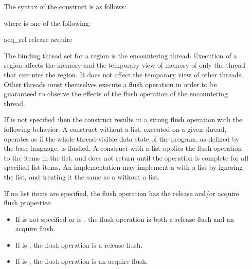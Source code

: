 \begin{fortranspecific}
The syntax of the  construct is as follows:

\begin{samepage}
where  is one of the following:

\begin{indentedcodelist}
acq_rel
release
acquire
\end{indentedcodelist}
\end{samepage}
\end{fortranspecific}

\binding
The binding thread set for a  region is the encountering thread. 
Execution of a  region affects the memory and the temporary view 
of memory of only the thread that executes the region. It does not affect the 
temporary view of other threads. Other threads must themselves execute a flush 
operation in order to be guaranteed to observe the effects of the flush operation
of the encountering thread.

\descr
If  is not specified then the  construct
results in a strong flush operation with the following behavior. A 
construct without a list, executed on a given thread, operates as if the whole
thread-visible data state of the program, as defined by the base language, is
flushed. A  construct with a list applies the flush operation to
the items in the list, and does not return until the operation is complete for
all specified list items. An implementation may implement a  with
a list by ignoring the list, and treating it the same as a 
without a list.

If no list items are specified, the flush operation has the release and/or
acquire flush properties:

\begin{itemize}
\item If  is not specified or is , the 
      flush operation is both a release flush and an acquire flush.
\item If  is , the flush operation is a 
      release flush.
\item If  is , the flush operation is an 
      acquire flush.
\end{itemize}

